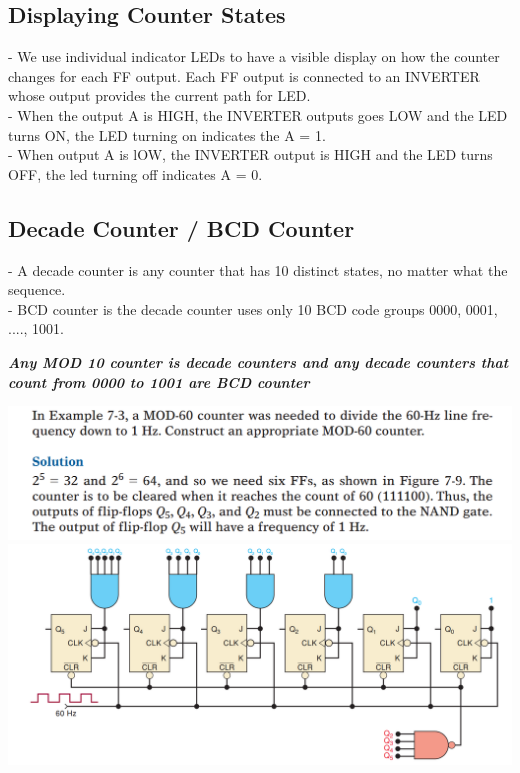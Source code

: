 \documentclass[12pt]{article}
\begin{document}
\subsection{Displaying Counter States}
- We use individual indicator LEDs to have a visible display on how the counter changes for each FF output. Each FF output is connected to an INVERTER whose output provides the current path for LED. \\
- When the output A is HIGH, the INVERTER outputs goes LOW and the LED turns ON, the LED turning on indicates the A = 1. \\
- When output A is lOW, the INVERTER output is HIGH and the LED turns OFF, the led turning off indicates A = 0. \\
\subsection{Decade Counter / BCD Counter}
- A decade counter is any counter that has 10 distinct states, no matter what the sequence. \\
- BCD counter is the decade counter uses only 10 BCD code groups 0000, 0001, ...., 1001. \\
\begin{center}
\textit{\textbf{Any MOD 10 counter is decade counters and any decade counters that count from 0000 to 1001 are BCD counter}}
\end{center}
\bigbreak
\includegraphics[scale = 0.6]{hinh45}
\bigbreak
\includegraphics[scale = 0.6]{hinh46}
\bigbreak
\end{document}
